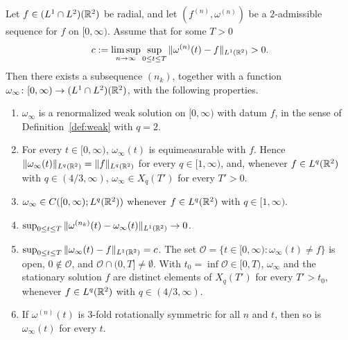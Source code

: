 \begin{theorem}
\label{thm:criterion}
Let $f\in (L^1\cap L^2)(\mathbb{R}^2)$ be radial, and let
$(f^{(n)},\omega^{(n)})$ be a $2$-admissible sequence for $f$ on $[0,\infty)$.
Assume that for some $T>0$
\begin{equation}
\label{eq:defect}
c:=\limsup_{n\to\infty}\sup_{0\le t\le T}\|\omega^{(n)}(t)-f\|_{L^1(\mathbb{R}^2)}>0 .
\end{equation}
Then there exists a subsequence $(n_k)$, together with a function
$\omega_\infty\colon[0,\infty)\to (L^1\cap L^2)(\mathbb{R}^2)$, with the following properties.
\begin{enumerate}[label=\textup{(\roman*)}]
\item $\omega_\infty$ is a renormalized weak solution on $[0,\infty)$ with datum $f$,
  in the sense of Definition~\ref{def:weak} with $q=2$.
\item For every $t\in[0,\infty)$, $\omega_\infty(t)$ is equimeasurable with $f$.
  Hence $\|\omega_\infty(t)\|_{L^q(\mathbb{R}^2)}=\|f\|_{L^q(\mathbb{R}^2)}$ for every $q\in[1,\infty)$,
  and, whenever $f\in L^q(\mathbb{R}^2)$ with $q\in(4/3,\infty)$, $\omega_\infty\in X_q(T')$ for
  every $T'>0$.
\item $\omega_\infty\in C([0,\infty);L^q(\mathbb{R}^2))$ whenever $f\in L^q(\mathbb{R}^2)$ with
  $q\in[1,\infty)$.
\item $\sup_{0\le t\le T}\|\omega^{(n_k)}(t)-\omega_\infty(t)\|_{L^1(\mathbb{R}^2)}\to0$.
\item $\sup_{0\le t\le T}\|\omega_\infty(t)-f\|_{L^1(\mathbb{R}^2)}=c$. The set
  $\mathcal O=\{t\in[0,\infty):\omega_\infty(t)\ne f\}$ is open, $0\notin\mathcal O$,
  and $\mathcal O\cap(0,T]\ne\emptyset$. With $t_0=\inf\mathcal O\in[0,T)$,
  $\omega_\infty$ and the
  stationary solution $f$ are distinct elements of $X_q(T')$ for every
  $T'>t_0$, whenever $f\in L^q(\mathbb{R}^2)$ with $q\in(4/3,\infty)$.
\item If $\omega^{(n)}(t)$ is $3$-fold rotationally symmetric for all $n$ and $t$, then so is
  $\omega_\infty(t)$ for every $t$.
\end{enumerate}
\end{theorem}

